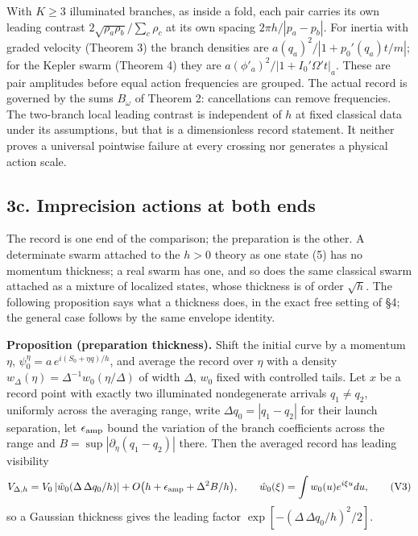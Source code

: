 \documentclass[11pt,a4paper]{article}
\begin{document}
With \(K\ge3\) illuminated branches, as inside a fold, each pair carries
its own leading contrast \(2\sqrt{\rho_a\rho_b}/\sum_c\rho_c\) at its
own spacing \(2\pi h/|p_a-p_b|\). For inertia with graded velocity
(Theorem 3) the branch densities are \(a(q_a)^2/|1+p_0'(q_a)t/m|\); for
the Kepler swarm (Theorem 4) they are
\(a(\phi'_a)^2/|1+I_0'\Omega't|_a\). These are pair amplitudes before
equal action frequencies are grouped. The actual record is governed by
the sums \(B_\omega\) of Theorem 2: cancellations can remove
frequencies. The two-branch local leading contrast is independent of
\(h\) at fixed classical data under its assumptions, but that is a
dimensionless record statement. It neither proves a universal pointwise
failure at every crossing nor generates a physical action scale.

\hypertarget{c.-imprecision-actions-at-both-ends}{%
\subsection{3c. Imprecision actions at both
ends}\label{c.-imprecision-actions-at-both-ends}}

The record is one end of the comparison; the preparation is the other. A
determinate swarm attached to the \(h>0\) theory as one state (5) has no
momentum thickness; a real swarm has one, and so does the same classical
swarm attached as a mixture of localized states, whose thickness is of
order \(\sqrt h\). The following proposition says what a thickness does,
in the exact free setting of §4; the general case follows by the same
envelope identity.

\textbf{Proposition (preparation thickness).} Shift the initial curve by
a momentum \(\eta\), \(\psi_0^\eta=a\,e^{i(S_0+\eta q)/h}\), and average
the record over \(\eta\) with a density
\(w_\Delta(\eta)=\Delta^{-1}w_0(\eta/\Delta)\) of width \(\Delta\),
\(w_0\) fixed with controlled tails. Let \(x\) be a record point with
exactly two illuminated nondegenerate arrivals \(q_1\neq q_2\),
uniformly across the averaging range, write \(\Delta q_0=|q_1-q_2|\) for
their launch separation, let \(\epsilon_{\rm amp}\) bound the variation
of the branch coefficients across the range and
\(B=\sup|\partial_\eta(q_1-q_2)|\) there. Then the averaged record has
leading visibility \[V_{\Delta,h}=V_0\,|\hat w_0(\Delta\,\Delta q_0/h)|
+O\big(h+\epsilon_{\rm amp}+\Delta^2B/h\big),\qquad
\hat w_0(\xi)=\int w_0(u)e^{i\xi u}du,\tag{V3}\] so a Gaussian thickness
gives the leading factor \(\exp[-(\Delta\,\Delta q_0/h)^2/2]\).
\end{document}
